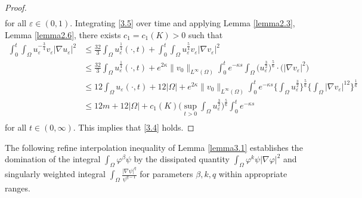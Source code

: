 \documentclass[12pt]{article}
\theoremstyle{plain}
\theoremstyle{definition}
\numberwithin{equation}{section}
\begin{document}
\begin{proof}
\begin{equation}
\begin{split}
         \end{split}
    \end{equation}
    for all $\varepsilon\in(0,1)$.
   Integrating \eqref{3.5} over time and applying Lemma \ref{lemma2.3}, Lemma \ref{lemma2.6}, there exists $c_1=c_1(K)>0$ such that
    \begin{equation*}
        \begin{split}
            \int_0^t\int_\Omega u_\varepsilon^{-\frac{3}{4}} v_\varepsilon|\nabla u_\varepsilon|^2&\leq \frac{32}{3}\int_\Omega u_\varepsilon^{\frac1 4}(\cdot,t)+\int_0^t\int_\Omega u_\varepsilon^{\frac5 4}v_\varepsilon|\nabla v_\varepsilon|^2\\
            &\leq\frac{32}{3}\int_\Omega u_\varepsilon^{\frac1 4}(\cdot,t)+e^{2\kappa}\|v_0\|_{L^\infty(\Omega)}\int_0^t e^{-\kappa s}\int_\Omega \big(u_\varepsilon^{\frac3 2}\big)^{\frac5 6}\cdot\big(|\nabla v_\varepsilon|^2\big)\\
            &\leq 12\int_\Omega u_\varepsilon(\cdot,t)+12|\Omega|+e^{2\kappa}\|v_0\|_{L^\infty(\Omega)}\int_0^t e^{-\kappa s}\bigg\{\int_\Omega u_\varepsilon^{\frac{3}{2}} \bigg\}^{\frac{5}{6}}\bigg\{\int_\Omega |\nabla v_\varepsilon|^{12}\bigg\}^{\frac{1}{6}}\\
            &\leq 12m+12|\Omega|+c_1(K)\bigg(\sup\limits_{t>0}\int_\Omega u_\varepsilon^{\frac{3}{2}}\bigg)^{\frac{5}{6}}\int_0^t e^{-\kappa s}\\
        \end{split}
    \end{equation*}
    for all $t\in(0,\infty)$. This implies that \eqref{3.4} holds.
\end{proof}
The following refine interpolation inequality of Lemma \ref{lemma3.1} establishes the domination of the integral
 $\int_\Omega \varphi^{\beta}\psi$
by the dissipated quantity   $\int_{\Omega}\varphi^{k}\psi|\nabla \varphi|^2$ %
and  singularly weighted integral  $\int_\Omega\frac{|\nabla \psi|^q}{\psi^{q-1}}$ for parameters $\beta,k,q$ within appropriate ranges.


\end{document}
